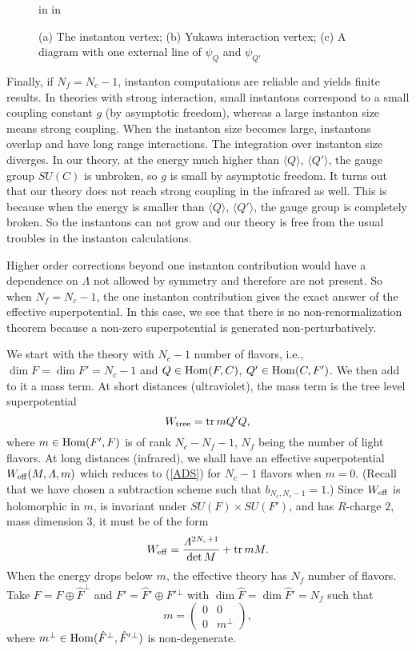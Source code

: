 \documentclass[lecture]{qft-l}
\newcommand{\Lam}{\varLambda}
\newcommand{\bef}{\begin{figure}[h]
		\vspace{3ex}}
\newcommand{\enf}{\end{figure}}
\newcommand{\bra}{\langle}
\newcommand{\ket}{\rangle}
\newcommand{\tr}{{\rm tr}}
\newcommand{\eff}{_{{\rm eff}}}
\newcommand{\tree}{_{{\rm tree}}}
\newcommand{\four}[4]{\left(	\begin{array}{cc}
				{#1}	&	{#2}	\\
				{#3}	&	{#4}
				\end{array}   \right)}
\newcommand{\Hom}{{\rm Hom}}
\newcommand{\FT}{F'}%
\newcommand{\QT}{Q'}%
\newcommand{\FTh}{\hat{F}'}
\numberwithin{figure}{chapter}
\begin{document}
\bef
{} in
 in
\centerline{}
\vspace{1em}
\caption{\protect\label{INST}(a) The instanton vertex;
(b) Yukawa interaction vertex;
(c) A diagram with one external line of $\psi_Q$ and $\psi_{\QT}$}
\enf

Finally, if $N_f=N_c-1$, instanton computations are reliable and 
yields finite results.
In theories with strong interaction, small instantons correspond to a small
coupling constant $g$ (by asymptotic freedom), whereas a large instanton size 
means strong coupling.
When the instanton size becomes large, instantons overlap and have long
range interactions.
The integration over instanton size diverges.
In our theory, at the energy much higher than $\bra Q\ket$, $\bra\QT\ket$,
the gauge group $SU(C)$ is unbroken, so $g$ is small by asymptotic freedom.
It turns out that our theory does not reach strong coupling in the infrared
as well.
This is because when the energy is smaller than $\bra Q\ket$, $\bra\QT\ket$,
the gauge group is completely broken.
So the instantons can not grow and our theory is free from the usual troubles 
in the instanton calculations.

Higher order corrections beyond one instanton contribution would have
a dependence on $\Lam$ not allowed by symmetry and therefore are not present.
So when $N_f=N_c-1$, the one instanton contribution gives the exact answer of 
the effective superpotential.
In this case, we see that there is no non-renormalization theorem
because a non-zero superpotential is generated non-perturbatively.


We start with the theory with $N_c-1$ number of flavors, i.e.,
$\dim F=\dim\FT=N_c-1$ and $Q\in\Hom(F,C)$, $\QT\in\Hom(C,\FT)$.
We then add to it a mass term.
At short distances (ultraviolet), the mass term is the tree level
superpotential
	\begin{equation}
W\tree=\tr\,m\QT Q,
	\end{equation}
where $m\in\Hom(\FT,F)$ is of rank $N_c-N_f-1$, $N_f$ being the number of
light flavors.
At long distances (infrared), we shall have an effective superpotential 
$W\eff(M,\Lam,m)$ which reduces to (\ref{ADS}) for $N_c-1$ flavors when $m=0$.
(Recall that we have chosen a subtraction scheme such that 
$b_{N_c,N_c-1}=1$.)
Since $W\eff$ is holomorphic in $m$, is invariant under 
$SU(F)\times SU(\FT)$, and has $R$-charge $2$, mass dimension $3$,
it must be of the form
	\begin{equation}\label{ADSm}
W\eff=\frac{\Lam^{2N_c+1}}{\det M}+\tr\,mM.	
	\end{equation}
When the energy drops below $m$, the effective theory has $N_f$ number of 
flavors.
Take $F=\hat{F}\oplus\hat{F}^\perp$ and $\FT=\FTh\oplus\FTh{^{\perp}}$
with $\dim\hat{F}=\dim\FTh=N_f$ such that 
	\begin{equation}\label{mblock}
m=\four{0}{0}{0}{m^\perp},
	\end{equation}
where $m^\perp\in\Hom(\hat{F}^\perp,\FTh{^{\perp}})$ is non-degenerate.
\end{document}
